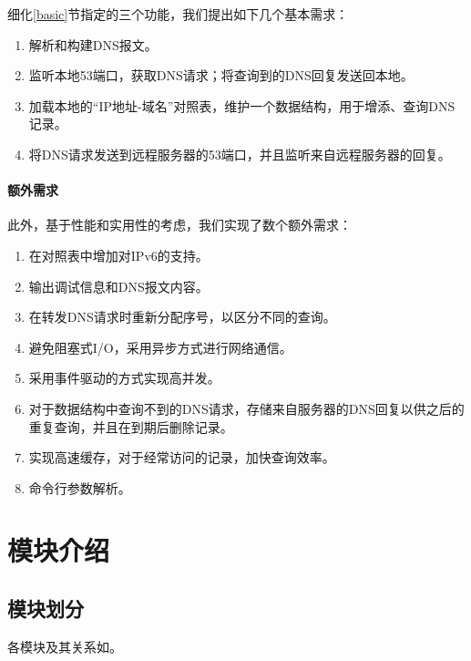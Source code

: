 \documentclass[lang=cn,11pt,a4paper,cite=authornum]{paper}
\begin{document}
细化\ref{basic}节指定的三个功能，我们提出如下几个基本需求：

\begin{enumerate}
    \item 解析和构建DNS报文。
    \item 监听本地53端口，获取DNS请求；将查询到的DNS回复发送回本地。
    \item 加载本地的“IP地址-域名”对照表，维护一个数据结构，用于增添、查询DNS记录。
    \item 将DNS请求发送到远程服务器的53端口，并且监听来自远程服务器的回复。
\end{enumerate}

\paragraph{额外需求}

此外，基于性能和实用性的考虑，我们实现了数个额外需求：

\begin{enumerate}
    \item 在对照表中增加对IPv6的支持。
    \item 输出调试信息和DNS报文内容。
    \item 在转发DNS请求时重新分配序号，以区分不同的查询。
    \item 避免阻塞式I/O，采用异步方式进行网络通信。
    \item 采用事件驱动的方式实现高并发。
    \item 对于数据结构中查询不到的DNS请求，存储来自服务器的DNS回复以供之后的重复查询，并且在到期后删除记录。
    \item 实现高速缓存，对于经常访问的记录，加快查询效率。
    \item 命令行参数解析。
\end{enumerate}

\section{模块介绍}

\subsection{模块划分}

各模块及其关系如。
\end{document}
